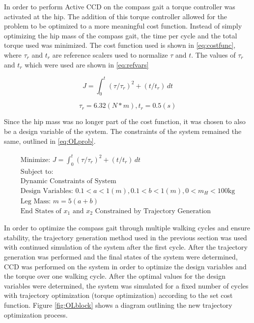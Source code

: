 \documentclass{./springer/svjour3}
\begin{document}
In order to perform Active CCD on the compass gait a torque controller was activated at the hip. The addition of this torque controller allowed
for the problem to be optimized to a more meaningful cost function. Instead of simply optimizing the hip mass of the compass gait, the time per cycle 
and the total torque used was minimized. The cost function used is shown in \ref{eq:costfunc}, where $\tau_r$ and $t_r$ are reference scalers used 
to normalize $\tau$ and $t$. The values of $\tau_r$ and $t_r$ which were used are shown in \ref{eq:refvars}

\begin{equation}
\label{eq:costfunc}
J = 
\int_{0}^{t} (\tau / \tau_r)^2 + (t/t_r) \,dt 
\end{equation}

\begin{equation}
\label{eq:refvars}
\tau_r = 6.32 (N*m), 
t_r = 0.5 (s)
\end{equation}

Since the hip mass was no longer part of the cost function, it was chosen to also 
be a design variable of the system. The constraints of the system remained the same, outlined in \ref{eq:OLprob}.

\begin{equation}
\begin{aligned}
\text{Minimize: } J = \int_{0}^{t} (\tau / \tau_r)^2 + (t/t_r) \,dt \\
\text{Subject to:}\\
\text{Dynamic Constraints of System}\\
\text{Design Variables: } 0.1<a<1 (m), 0.1<b<1 (m), 0<m_H<100 \text{kg}\\
\text{Leg Mass: } m = 5(a+b)\\
\text{End States of $x_1$ and $x_2$ Constrained by Trajectory Generation}
\end{aligned}
\label{eq:OLprob}
\end{equation}

In order to optimize the compass gait through multiple walking cycles and ensure stability, the trajectory generation method used
in the previous section was used with continued simulation of the system after the first cycle.
After the trajectory generation was performed and the final states of the system were determined, CCD was performed on the system in order to
optimize the design variables and the torque over one walking cycle. After the optimal values for the design variables were determined, the system was 
simulated for a fixed number of cycles with trajectory optimization (torque optimization) according to the set cost function. Figure \ref{fig:OLblock}
shows a diagram outlining the new trajectory optimization process.
\end{document}
